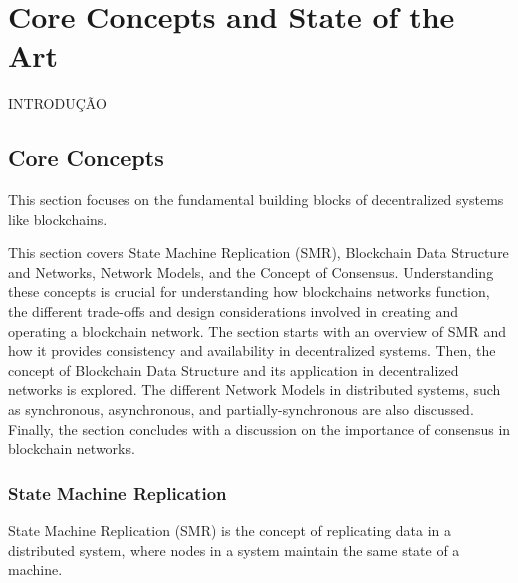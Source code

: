 \chapter{Core Concepts and State of the Art}
INTRODUÇÃO
\section{Core Concepts}
This section focuses on the fundamental building blocks of decentralized systems like blockchains.

This section covers State Machine Replication (SMR), Blockchain Data Structure and Networks, Network Models, and the Concept of Consensus.
Understanding these concepts is crucial for understanding how blockchains networks function, the different trade-offs and design considerations involved in creating and operating a blockchain network. The section starts with an overview of SMR and how it provides consistency and availability in decentralized systems.
Then, the concept of Blockchain Data Structure and its application in decentralized networks is explored. The different Network Models in distributed systems, such as synchronous, asynchronous, and partially-synchronous are also discussed. Finally, the section concludes with a discussion on the importance of consensus in blockchain networks.


\subsection*{\textbf{State Machine Replication}}
State Machine Replication (SMR) is the concept of replicating data in a distributed system, where nodes in a system maintain the same state of a machine.

